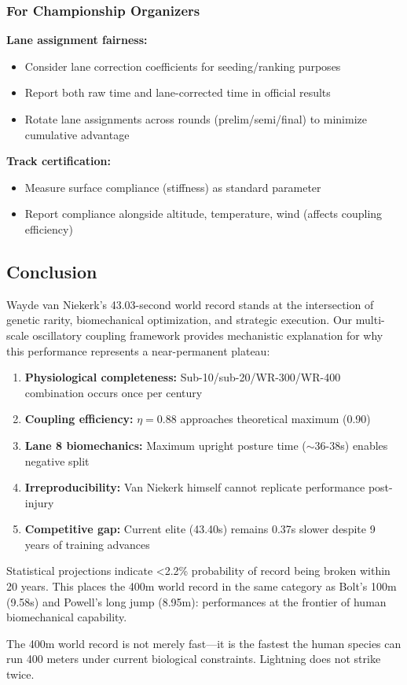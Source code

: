 \subsubsection{For Championship Organizers}

\textbf{Lane assignment fairness:}
\begin{itemize}
    \item Consider lane correction coefficients for seeding/ranking purposes
    \item Report both raw time and lane-corrected time in official results
    \item Rotate lane assignments across rounds (prelim/semi/final) to minimize cumulative advantage
\end{itemize}

\textbf{Track certification:}
\begin{itemize}
    \item Measure surface compliance (stiffness) as standard parameter
    \item Report compliance alongside altitude, temperature, wind (affects coupling efficiency)
\end{itemize}

\subsection{Conclusion}

Wayde van Niekerk's 43.03-second world record stands at the intersection of genetic rarity, biomechanical optimization, and strategic execution. Our multi-scale oscillatory coupling framework provides mechanistic explanation for why this performance represents a near-permanent plateau:

\begin{enumerate}
    \item \textbf{Physiological completeness:} Sub-10/sub-20/WR-300/WR-400 combination occurs once per century

    \item \textbf{Coupling efficiency:} $\eta = 0.88$ approaches theoretical maximum (0.90)

    \item \textbf{Lane 8 biomechanics:} Maximum upright posture time ($\sim$36-38s) enables negative split

    \item \textbf{Irreproducibility:} Van Niekerk himself cannot replicate performance post-injury

    \item \textbf{Competitive gap:} Current elite (43.40s) remains 0.37s slower despite 9 years of training advances
\end{enumerate}

Statistical projections indicate <2.2\% probability of record being broken within 20 years. This places the 400m world record in the same category as Bolt's 100m (9.58s) and Powell's long jump (8.95m): performances at the frontier of human biomechanical capability.

The 400m world record is not merely fast—it is the fastest the human species can run 400 meters under current biological constraints. Lightning does not strike twice.
